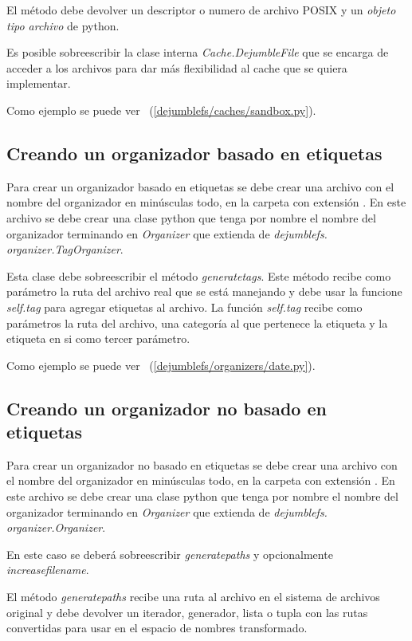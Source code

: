El método debe devolver un descriptor o numero de archivo POSIX y un \textit{objeto tipo archivo} de python.

Es posible sobreescribir la clase interna \textit{Cache.DejumbleFile} que se encarga de acceder a los archivos para dar más flexibilidad al cache que se quiera implementar. 

Como ejemplo se puede ver ~(\ref{dejumblefs/caches/sandbox.py}).

\subsection{Creando un organizador basado en etiquetas}

Para crear un organizador basado en etiquetas se debe crear una archivo con el nombre del organizador en minúsculas todo, en la carpeta  con extensión . En este archivo se debe crear una clase python que tenga por nombre el nombre del organizador terminando en \textit{Organizer} que extienda de \textit{dejumblefs. organizer.TagOrganizer}.

Esta clase debe sobreescribir el método \textit{generatetags}. Este método recibe como parámetro la ruta del archivo real que se está manejando y debe usar la funcione \textit{self.tag} para agregar etiquetas al archivo. La función \textit{self.tag} recibe como parámetros la ruta del archivo, una categoría al que pertenece la etiqueta y la etiqueta en si como tercer parámetro.

Como ejemplo se puede ver ~(\ref{dejumblefs/organizers/date.py}).

\subsection{Creando un organizador no basado en etiquetas}

Para crear un organizador no basado en etiquetas se debe crear una archivo con el nombre del organizador en minúsculas todo, en la carpeta  con extensión . En este archivo se debe crear una clase python que tenga por nombre el nombre del organizador terminando en \textit{Organizer} que extienda de \textit{dejumblefs. organizer.Organizer}.

En este caso se deberá sobreescribir \textit{generatepaths} y opcionalmente \textit{increasefilename}.

El método \textit{generatepaths} recibe una ruta al archivo en el sistema de archivos original y debe devolver un iterador, generador, lista o tupla con las rutas convertidas para usar en el espacio de nombres transformado.

